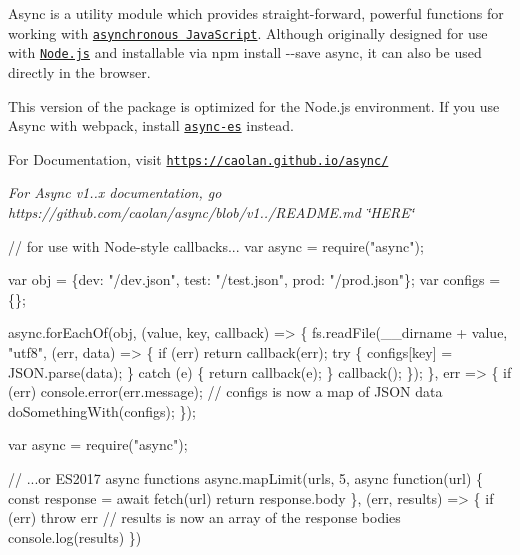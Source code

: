 

\href{https://travis-ci.org/caolan/async}{\tt } \href{https://www.npmjs.com/package/async}{\tt } \href{https://coveralls.io/r/caolan/async?branch=master}{\tt } \href{https://gitter.im/caolan/async?utm_source=badge&utm_medium=badge&utm_campaign=pr-badge&utm_content=badge}{\tt } \href{https://www.libhive.com/providers/npm/packages/async}{\tt } \href{https://www.jsdelivr.com/package/npm/async}{\tt }

Async is a utility module which provides straight-\/forward, powerful functions for working with \href{http://caolan.github.io/async/global.html}{\tt asynchronous Java\+Script}. Although originally designed for use with \href{https://nodejs.org/}{\tt Node.\+js} and installable via {\ttfamily npm install -\/-\/save async}, it can also be used directly in the browser.

This version of the package is optimized for the Node.\+js environment. If you use Async with webpack, install \href{https://www.npmjs.com/package/async-es}{\tt {\ttfamily async-\/es}} instead.

For Documentation, visit \href{https://caolan.github.io/async/}{\tt https\+://caolan.\+github.\+io/async/}

{\itshape For Async v1..\+x documentation, go https\+://github.com/caolan/async/blob/v1../\+R\+E\+A\+D\+ME.md \char`\"{}\+H\+E\+R\+E\char`\"{}}


\begin{DoxyCode}
// for use with Node-style callbacks...
var async = require("async");

var obj = \{dev: "/dev.json", test: "/test.json", prod: "/prod.json"\};
var configs = \{\};

async.forEachOf(obj, (value, key, callback) => \{
    fs.readFile(\_\_dirname + value, "utf8", (err, data) => \{
        if (err) return callback(err);
        try \{
            configs[key] = JSON.parse(data);
        \} catch (e) \{
            return callback(e);
        \}
        callback();
    \});
\}, err => \{
    if (err) console.error(err.message);
    // configs is now a map of JSON data
    doSomethingWith(configs);
\});
\end{DoxyCode}



\begin{DoxyCode}
var async = require("async");

// ...or ES2017 async functions
async.mapLimit(urls, 5, async function(url) \{
    const response = await fetch(url)
    return response.body
\}, (err, results) => \{
    if (err) throw err
    // results is now an array of the response bodies
    console.log(results)
\})
\end{DoxyCode}
 